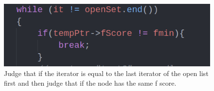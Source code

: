 \documentclass[conference]{IEEEtran}
\begin{document}
\begin{figure}[htbp]
	\centering
	\includegraphics[scale=0.40]{figs/fig5_2.png}
	\caption{Judge that if the iterator is equal to the last iterator of the open list first and then judge that if the node has the same f score.}
	\label{fig:label5_2}
\end{figure}
%
%
%



\end{document}
